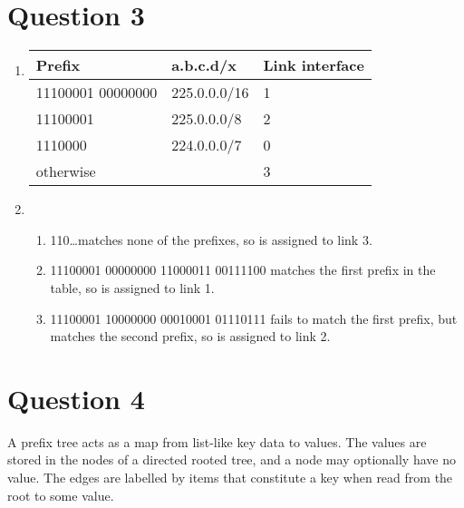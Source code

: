 \documentclass{article}
\begin{document}
\section*{Question 3}
\begin{enumerate}
  \item
    \begin{tabular}{l | l | l}
      Prefix & a.b.c.d/x & Link interface \\
      \hline
      11100001 00000000 & 225.0.0.0/16 & 1 \\
      11100001 & 225.0.0.0/8 & 2 \\
      1110000 & 224.0.0.0/7 & 0 \\
      otherwise & & 3 \\
    \end{tabular}
  \item
    \begin{enumerate}
      \item 110\dots matches none of the prefixes, so is assigned to link 3.
      \item 11100001 00000000 11000011 00111100 matches the first prefix in the table, so is assigned to link 1.
      \item 11100001 10000000 00010001 01110111 fails to match the first prefix, but matches the second prefix, so is assigned to link 2.
    \end{enumerate}
\end{enumerate}

\section*{Question 4}
A prefix tree acts as a map from list-like key data to values. The values are stored in the nodes of a directed rooted tree, and a node may optionally have no value. The edges are labelled by items that constitute a key when read from the root to some value.


\end{document}
